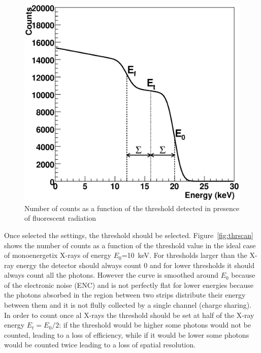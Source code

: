 \begin{figure}[t!]
\begin{center}
\includegraphics[width=\textwidth]{images/thr_scan_fluo}
\end{center}
\caption{Number of counts as a function of the threshold detected in presence of fluorescent radiation}\label{fig:thrscanfluo}
\end{figure}

Once selected the settings, the threshold should be selected.
Figure~\ref{fig:thrscan} shows the number of counts as a function of the threshold value in the ideal case of monoenergetix X-rays of energy $E_0$=10~keV.
For thresholds larger than the X-ray energy the detector should always count 0 and for lower thresholds it should always count all the photons. However the curve is smoothed around $E_0$ because of the electronic noise (ENC) and is not perfectly flat for lower energies because the photons absorbed in the region between two strips distribute their energy between them and it is not flully collected by a single channel (charge sharing).\\
In order to count once al X-rays the threshold should be set at half of the X-ray energy $E_t=E_0/2$: if the threshold would be higher some photons would not be counted, leading to a loss of efficiency, while if it would be lower some photons would be counted twice leading to a loss of spatial resolution. 

